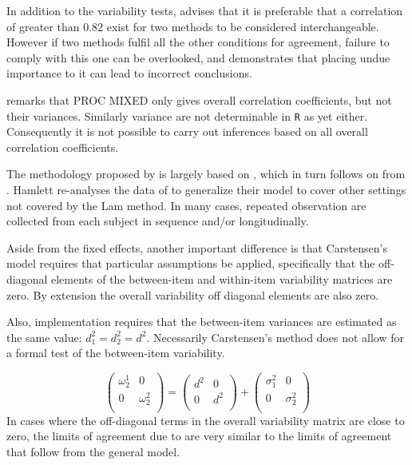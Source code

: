 \documentclass[12pt, a4paper]{report}
\theoremstyle{plain}
\theoremstyle{definition}
\theoremstyle{remark}
\begin{document}
			
			In addition to the variability tests, \citet{ARoy2009} advises that it is preferable that a correlation of greater than $0.82$ exist for two methods to be considered interchangeable. However if two methods fulfil all the other conditions for agreement, failure to comply with this one can be overlooked, and demonstrates that placing undue importance to it can lead to incorrect conclusions.
			
			\citet{ARoy2009} remarks that PROC MIXED only gives overall correlation coefficients, but not their variances. Similarly variance are not determinable in \texttt{R} as yet either. Consequently it is not possible to carry out inferences based on all overall correlation coefficients.
			
			
			
			
			
			
			The methodology proposed by \citet{ARoy2009} is largely based on \citet{hamlett}, which in turn follows on from \citet{lam}. Hamlett re-analyses the data of \citet{lam} to generalize their model to cover other settings not covered by the Lam method. In many cases, repeated observation are collected from each subject in sequence  and/or longitudinally.
			
			
			
			
			
			Aside from the fixed effects, another important difference is that Carstensen's model requires that particular assumptions be applied, specifically that the off-diagonal elements of the between-item
			and within-item variability matrices are zero. By extension the
			overall variability off diagonal elements are also zero.
			
			
			
			
			Also, implementation requires that the between-item variances are
			estimated as the same value: $d^2_1 = d^2_2 = d^2$. Necessarily
			Carstensen's method does not allow for a formal test of the
			between-item variability.
			
			\[\left(\begin{array}{cc}
			\omega^1_2  & 0 \\
			0 & \omega^2_2 \\
			\end{array}  \right)
			=  \left(
			\begin{array}{cc}
			d^2  & 0 \\
			0 & d^2 \\
			\end{array} \right)+
			\left(
			\begin{array}{cc}
			\sigma^2_1  & 0 \\
			0 & \sigma^2_2 \\
			\end{array}\right)
			\]
			In cases where the off-diagonal terms in the overall variability
			matrix are close to zero, the limits of agreement due to \citet{BXC2008} are very similar to the limits of agreement that follow from the general model.
			
\end{document}
